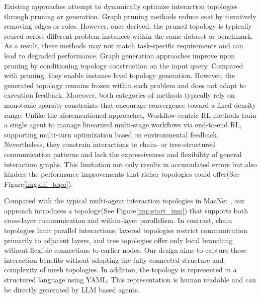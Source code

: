 \documentclass{article}
\theoremstyle{definition}
\begin{document}
Existing approaches attempt to dynamically optimize interaction topologies through pruning or generation. Graph pruning methods \citep{zhang2024cut, zhuge2024gptswarm} reduce cost by iteratively removing edges or roles. However, once derived, the pruned topology is typically reused across different problem instances within the same dataset or benchmark. As a result, these methods may not match task-specific requirements and can lead to degraded performance. Graph generation approaches \citep{zhang2024g} improve upon pruning by conditioning topology construction on the input query. Compared with pruning, they enable instance level topology generation. However, the generated topology remains frozen within each problem and does not adapt to execution feedback. Moreover, both categories of methods typically rely on monotonic sparsity constraints that encourage convergence toward a fixed density range. Unlike the aforementioned approaches, Workflow-centric RL methods \citep{gao2025flowreasoner, li2025chain} train a single agent to manage linearized multi-stage workflows via end-to-end RL, supporting multi-turn optimization based on environmental feedback. Nevertheless, they constrain interactions to chain- or tree-structured communication patterns and lack the expressiveness and flexibility of general interaction graphs. This limitation not only results in accumulated errors but also hinders the performance improvements that richer topologies could offer(See Figure\ref{img:dif_topo}). 


Compared with the typical multi-agent interaction topologies in MacNet \citep{qian2024scaling}, our approach introduces a topology(See Figure\ref{img:start_img}) that supports both cross-layer communication and within-layer parallelism. In contrast, chain topologies limit parallel interactions, layered topologies restrict communication primarily to adjacent layers, and tree topologies offer only local branching without flexible connections to earlier nodes. Our design aims to capture these interaction benefits without adopting the fully connected structure and complexity of mesh topologies. In addition, the topology is represented in a structured language using YAML. This representation is human readable and can be directly generated by LLM based agents.
\end{document}
